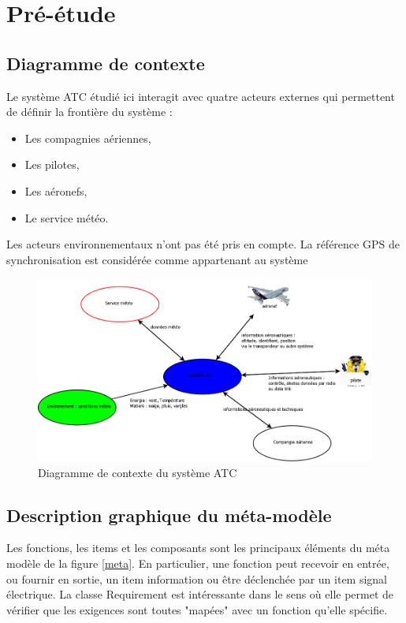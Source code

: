 \section{Pré-étude}


\subsection{ Diagramme de contexte }

Le système ATC étudié ici interagit avec quatre acteurs externes qui permettent de définir la frontière du système : 

\begin{itemize}
	\item Les compagnies aériennes,
	\item Les pilotes,
	\item Les aéronefs,
	\item Le service météo. 
\end{itemize}

Les acteurs environnementaux n'ont pas été pris en compte. La référence GPS de synchronisation est considérée comme appartenant au système

	\begin{figure}[H]
	\begin{center}	
		\includegraphics[scale=0.35]{images/ctx}
		\caption{Diagramme de contexte du système ATC}
		\label{ctx}
	\end{center}
\end{figure}

\subsection{ Description graphique du méta-modèle }

Les fonctions, les items et les composants sont les principaux éléments du méta modèle de la  figure \ref{meta}. En particulier, une fonction peut recevoir en entrée, ou fournir en sortie, un item information ou être déclenchée par un item signal électrique. La classe Requirement est intéressante dans le sens où elle permet de vérifier que les exigences sont toutes "mapées" avec un fonction qu'elle spécifie. 

